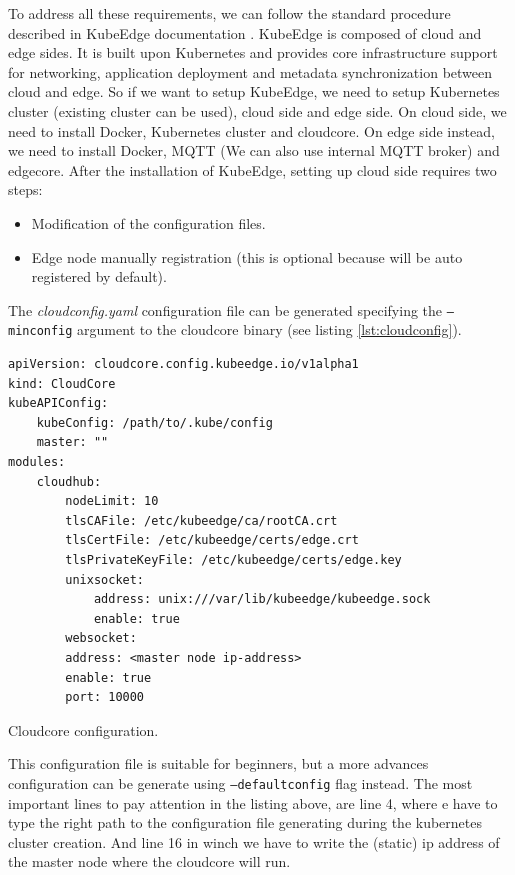 To address all these requirements, we can follow the standard procedure described in KubeEdge documentation \cite{kubeedgedoc}.
KubeEdge is composed of cloud and edge sides. It is built upon Kubernetes and provides core infrastructure support for networking, application deployment and metadata synchronization between cloud and edge. So if we want to setup KubeEdge, we need to setup Kubernetes cluster (existing cluster can be used), cloud side and edge side.
On cloud side, we need to install Docker, Kubernetes cluster and cloudcore. On edge side instead, we need to install Docker, MQTT (We can also use internal MQTT broker) and edgecore. 
After the installation of KubeEdge, setting up cloud side requires two steps: 
\begin{itemize}
	\item Modification of the configuration files.
	\item Edge node manually registration (this is optional because will be auto registered by default).
\end{itemize}

The \textit{cloudconfig.yaml} configuration file can be generated specifying the \texttt{--minconfig} argument to the cloudcore binary (see listing \ref{lst:cloudconfig}).

\begin{listing}[H]
\begin{verbatim}
apiVersion: cloudcore.config.kubeedge.io/v1alpha1
kind: CloudCore
kubeAPIConfig:
    kubeConfig: /path/to/.kube/config
    master: ""
modules:
    cloudhub:
        nodeLimit: 10
        tlsCAFile: /etc/kubeedge/ca/rootCA.crt
        tlsCertFile: /etc/kubeedge/certs/edge.crt
        tlsPrivateKeyFile: /etc/kubeedge/certs/edge.key
        unixsocket:
            address: unix:///var/lib/kubeedge/kubeedge.sock
            enable: true
        websocket:
        address: <master node ip-address>
        enable: true
        port: 10000
\end{verbatim}
\caption{Cloudcore configuration.}
\label{lst:cloudconfig}
\end{listing}

This configuration file is suitable for beginners, but a more advances configuration can be generate using \texttt{--defaultconfig} flag instead.
The most important lines to pay attention in the listing above, are line 4, where e have to type the right path to the configuration file generating during the kubernetes cluster creation. And line 16 in winch we have to write the (static) ip address of the master node where the cloudcore will run.

